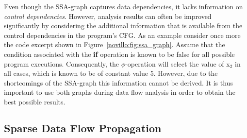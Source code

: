 Even though the SSA-graph captures data dependencies, it lacks information on
\emph{control dependencies}. However, analysis results can often be improved
significantly by considering the additional information that is available from
the control dependencies in the program's CFG. As an example consider once more
the code excerpt shown in Figure~\ref{novillo:fig:ssa_graph}. Assume that the
condition associated with the \textbf{if} operation is known to be false for all
possible program executions. Consequently, the $\phi$-operation will select the
value of x$_2$ in all cases, which is known to be of constant value $5$.
However, due to the shortcomings of the SSA-graph this information cannot be
derived. It is thus important to use both graphs during data flow analysis
in order to obtain the best possible results.

\subsection{Sparse Data Flow Propagation}

